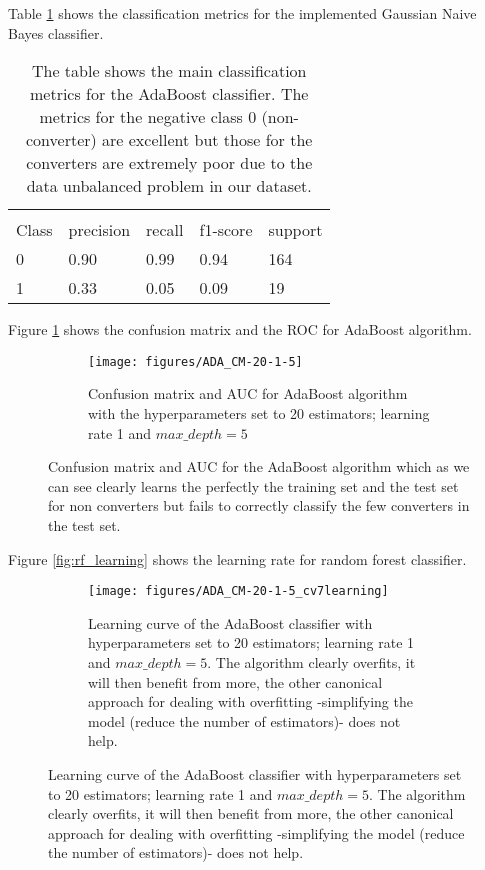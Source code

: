 \documentclass[11pt]{article}
\theoremstyle{definition}
\theoremstyle{remark}
\begin{document}
{Table \ref{tab:ada} shows the classification metrics for the implemented Gaussian Naive Bayes classifier.
\begin{table}[H]
\caption{Classification metrics for Ensemble classifier} 
\begin{center} 
\begin{tabular}{lllll}
\hline
\multicolumn{1}{c}{} \\
Class & precision & recall & f1-score & support     \\
\hline
0 & 0.90  &    0.99   &   0.94   &    164 \\
1 & 0.33  &    0.05   &   0.09   &    19 \\
\hline
\end{tabular}
\caption{The table shows the main classification metrics for the AdaBoost classifier. The metrics for the negative class 0 (non-converter) are excellent but those for the converters are extremely poor due to the data unbalanced problem in our dataset.
} \label{tab:ada} 
\end{center}
\end{table}

Figure \ref{fig:rf_ada} shows the confusion matrix and the ROC for AdaBoost algorithm. 
\begin{figure}[H]
    \centering
    \begin{subfigure}[t]{.8\textwidth}
        \centering
        \texttt{[image: figures/ADA\_CM-20-1-5]}
        \caption{Confusion matrix and AUC for AdaBoost algorithm with the hyperparameters set to 20 estimators; learning rate 1 and  $max\_depth=5$}
    \end{subfigure}

    
    \caption{Confusion matrix and AUC for the AdaBoost algorithm which as we can see clearly learns the perfectly the training set and the test set for non converters but fails to correctly classify the few converters in the test set. } \label{fig:rf_ada}
\end{figure}

Figure \ref{fig:rf_learning} shows the learning rate for random forest classifier. 
\begin{figure}[H]
    \centering
    \begin{subfigure}[t]{.8\textwidth}
        \centering
        \texttt{[image: figures/ADA\_CM-20-1-5\_cv7learning]}
        \caption{Learning curve of the AdaBoost classifier with  hyperparameters set to 20 estimators; learning rate 1 and  $max\_depth=5$. The algorithm clearly overfits, it will then benefit from more, the other canonical approach for dealing with overfitting -simplifying the model (reduce the number of estimators)- does not help.}
    \end{subfigure}


\end{figure}}
\end{document}
